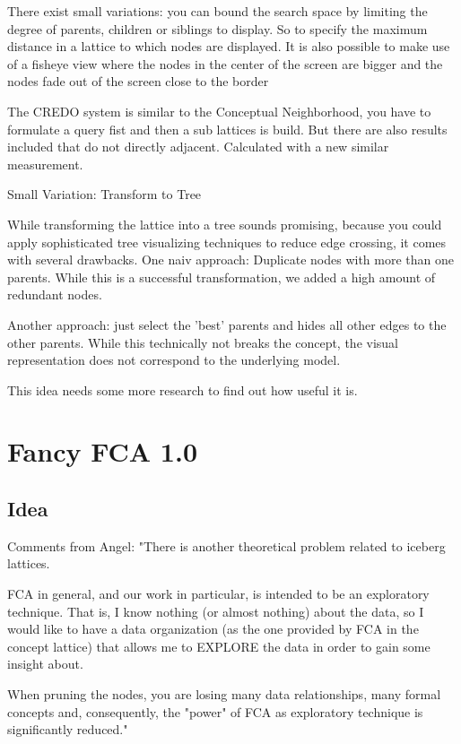 \documentclass[11pt]{article}
\begin{document}
There exist small variations: \cite{Carpineto1995} you can bound the search space by limiting the degree of parents, children or siblings to display. So to specify the maximum distance in a lattice to which nodes are displayed. It is also possible to make use of a fisheye view where  the nodes in the center of the screen are bigger and the nodes fade out of the screen close to the border

The CREDO system \cite{Carpineto2004} is similar to the Conceptual Neighborhood, you have to formulate a query fist and then a sub lattices is build. But there are also results included that do not directly adjacent. Calculated with a new similar measurement.

Small Variation: Transform to Tree

While transforming the lattice into a tree sounds promising, because you could apply sophisticated tree visualizing techniques to reduce edge crossing, it comes with several drawbacks. One naiv approach\cite{carpineto2004concept}: Duplicate nodes with more than one parents. While this is a successful transformation, we added a high amount of redundant nodes.

Another approach: just select the 'best' parents and hides all other edges to the other parents\cite{Melo2011}. While this technically not breaks the concept, the visual representation does not correspond to the underlying model.

This idea needs some more research to find out how useful it is.

\section{Fancy FCA 1.0}

\subsection{Idea}

Comments from Angel:
"There is another theoretical problem related to iceberg lattices.

FCA in general, and our work in particular, is intended to be an exploratory technique. That is, I know nothing (or almost nothing) about the data, so I would like to have a data organization (as the one provided by FCA in the concept lattice) that allows me to EXPLORE the data in order to gain some insight about.

When pruning the nodes, you are losing many data relationships, many formal concepts and, consequently, the "power" of FCA as exploratory technique is significantly reduced."
\end{document}
